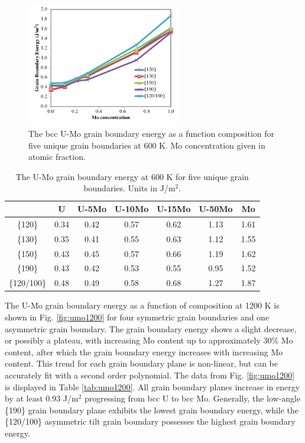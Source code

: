 \documentclass[review]{elsarticle}
\begin{document}
\begin{figure}[h]
 \centering
 \includegraphics[width=0.6\textwidth]{uvsmo600.png} 
 \caption{The bcc U-Mo grain boundary energy as a function composition for five unique grain boundaries at 600 K. Mo concentration given in atomic fraction.}
 \label{fig:umo600}
\end{figure}

\FloatBarrier

\begin{table}[h]
\caption{The U-Mo grain boundary energy at 600 K for five unique grain boundaries. Units in J/m$^{2}$. } \label{tab:umo600}
\begin{center}
\begin{tabular}{|c|c|c|c|c|c|c|}
	\hline
 & U & U-5Mo & U-10Mo & U-15Mo & U-50Mo & Mo \\
\hline
\{120\} & 0.34 & 0.42 & 0.57 & 0.62 & 1.13 & 1.61 \\
\{130\} & 0.35 & 0.41 & 0.55 & 0.63 & 1.12 & 1.55 \\ 
\{150\} & 0.43 & 0.45 & 0.57 & 0.66 & 1.19 & 1.62 \\ 
\{190\}	 & 0.43 & 0.42 & 0.53 & 0.55 & 0.95 & 1.52 \\ 
\{120/100\} & 0.48 & 0.49 & 0.58 & 0.68 & 1.27 & 1.87 \\
 	 \hline
\end{tabular}
\end{center}
\label{default}
\end{table}

\FloatBarrier

The U-Mo grain boundary energy as a function of composition at 1200 K is shown in Fig. \ref{fig:umo1200} for four symmetric grain boundaries and one asymmetric grain boundary. The grain boundary energy shows a slight decrease, or possibly a plateau, with increasing Mo content up to approximately 30\% Mo content, after which the grain boundary energy increases with increasing Mo content. This trend for each grain boundary plane is non-linear, but can be accurately fit with a second order polynomial. The data from Fig. \ref{fig:umo1200} is displayed in Table \ref{tab:umo1200}. All grain boundary planes increase in energy by at least 0.93 J/m$^{2}$ progressing from bcc U to bcc Mo. Generally, the low-angle \{190\} grain boundary plane exhibits the lowest grain boundary energy, while the \{120/100\} asymmetric tilt grain boundary possesses the highest grain boundary energy.
\end{document}
